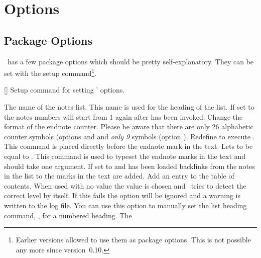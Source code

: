 \documentclass[load-preamble+]{cnltx-doc}
\begin{document}
\section{Options}\label{sec:options}
\subsection{Package Options}
\enotez\ has a few package options which should be pretty self-explanatory.
They can be set with the setup command\footnote{Earlier versions allowed to
  use them as package options. This is not possible any more since
  version~0.10.}.
\begin{commands}
  []
    Setup command for setting \enotez' options.
\end{commands}
\begin{options}
    The name of the notes list. This name is used for the heading of the
    list.
    If set to  the notes numbers will start from 1 again after
     has been invoked.
    Change the format of the endnote counter.  Please be aware that there are
    only 26 alphabetic counter symbols (options  and 
    and \emph{only 9} symbols (option ).
  \Default
    Redefine  to execute .  This command is placed
    directly before the endnote mark in the text.
    Lets  to be equal to .  This command
    is used to typeset the endnote marks in the text and should take one
    argument.
  \label{key:backref}
    If set to  and  has been
    loaded backlinks from the notes in the list to the marks in the text are
    added.
    \label{key:totoc}
    Add an entry to the table of contents.  When used
    with no value the value  is chosen and \enotez\ tries to detect
    the correct level by itself.  If this fails the option will be ignored and
    a warning is written to the log file.
    You can use this option to manually set the list heading command, \eg,
     for a numbered heading.  The

\end{options}
\end{document}
